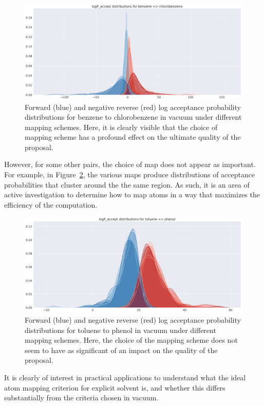 %
\begin{figure}
    \centering
    \includegraphics[width=\textwidth]{benzene_chlorobenzene_maps.png}
    \caption{Forward (blue) and negative reverse (red) log acceptance probability distributions for benzene to chlorobenzene in vacuum under different mapping schemes. Here, it is clearly visible that the choice of mapping scheme has a profound effect on the ultimate quality of the proposal.}
    \label{fig:benz_chlorobenz_different_maps}
\end{figure}
%
However, for some other pairs, the choice of map does not appear as important.
%
For example, in Figure~\ref{fig:toluene_phenol_different_maps}, the various maps produce distributions of acceptance probabilities that cluster around the the same region.
%
As such, it is an area of active investigation to determine how to map atoms in a way that maximizes the efficiency of the computation.
%
\begin{figure}
    \centering
    \includegraphics[width=\textwidth]{toluene_phenol_maps.png}
    \caption{Forward (blue) and negative reverse (red) log acceptance probability distributions for toluene to phenol in vacuum under different mapping schemes. Here, the choice of the mapping scheme does not seem to have as significant of an impact on the quality of the proposal.}
    \label{fig:toluene_phenol_different_maps}
\end{figure}
%
It is clearly of interest in practical applications to understand what the ideal atom mapping criterion for explicit solvent is, and whether this differs substantially from the criteria chosen in vacuum.
%
